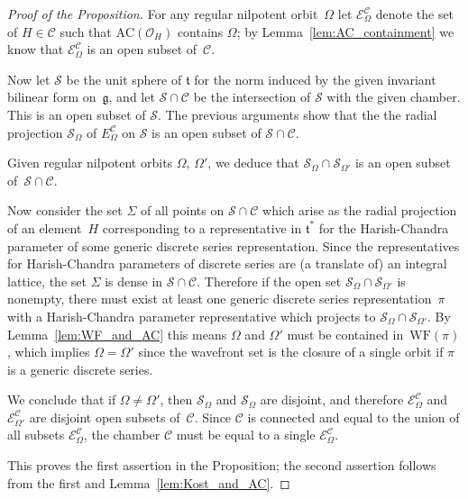 \documentclass[cupthm]{CUP-JNL-JMJ}
\numberwithin{equation}{section}
\theoremstyle{cupplain}
\theoremstyle{cupdefinition}
\theoremstyle{cupremark}
\theoremstyle{cupproof}
\newtheorem{proof}{Proof}
\renewcommand{\t}{\mathfrak t}
\newcommand{\g}{\mathfrak g}
\newcommand{\WF}{\mathrm{WF}}
\newcommand{\AC}{\mathrm{AC}}
\newcommand{\ECom}{\mathcal{E}^{\mathcal{C}}_\Omega}
\begin{document}
\begin{proof}[Proof of the  Proposition]
For any regular nilpotent orbit~$\Omega$ let $\ECom$  denote the set of $H \in \mathcal{C}$ such that $\AC(\mathcal{O}_H)$ contains $\Omega$; by Lemma~\ref{lem:AC_containment}  we know that   $\ECom$ is an open subset of~$\mathcal{C}$. 

Now let $\mathcal{S}$ be the unit sphere of $\t$ for the norm induced by the given invariant bilinear form on~$\g$, and let $\mathcal{S} \cap \mathcal{C}$ be the intersection of $\mathcal{S}$ with the given chamber. This is an open subset of $\mathcal{S}$. The previous arguments show that the the radial projection $\mathcal{S}_{\Omega}$ of  $E^{\mathcal{C}}_\Omega$ on $\mathcal{S}$ is an open subset of $\mathcal{S} \cap \mathcal{C}$. 

Given regular nilpotent orbits $\Omega$, $\Omega'$, we deduce that $\mathcal{S}_\Omega \cap \mathcal{S}_{\Omega'}$ is an open subset of~$\mathcal{S} \cap \mathcal{C}$.

Now consider the set $\Sigma$ of all points on $\mathcal{S} \cap \mathcal{C}$ which arise as the radial projection of an element~$H$ corresponding to a representative in $\t^\ast$ for the Harish-Chandra parameter of some generic discrete series representation. Since the representatives for Harish-Chandra parameters of discrete series are (a translate of) an integral lattice, the set $\Sigma$ is dense in $\mathcal{S} \cap \mathcal{C}$. Therefore if the open set $\mathcal{S}_\Omega \cap \mathcal{S}_{\Omega'}$ is nonempty, there must exist at least one generic discrete series representation~$\pi$ with a Harish-Chandra parameter representative which projects to $\mathcal{S}_\Omega \cap \mathcal{S}_{\Omega'}$. By Lemma~\ref{lem:WF_and_AC} this means $\Omega$ and $\Omega'$ must be contained in~$\WF(\pi)$, which implies $\Omega = \Omega'$ since the wavefront set is the closure of a single orbit if $\pi$ is a generic discrete series. 

We conclude that if $\Omega \neq \Omega'$, then $\mathcal{S}_\Omega$ and $\mathcal{S}_\Omega$ are disjoint, and therefore $\ECom$ and $\mathcal{E}^{\mathcal{C}}_{\Omega'}$ are disjoint open subsets of~$\mathcal{C}$. Since $\mathcal{C}$ is connected and equal to the union of all subsets $\mathcal{E}^{\mathcal{C}}_{\Omega}$, the chamber $\mathcal{C}$ must be equal to a single $\ECom$.

This proves the first assertion in the Proposition; the second assertion follows from the first and Lemma~\ref{lem:Kost_and_AC}.\end{proof}
\end{document}
